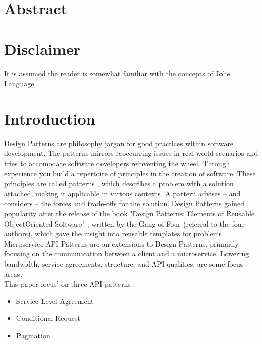 \documentclass[12pt]{article}
\begin{document}

\tableofcontents
\newpage


\section{Abstract}

\section{Disclaimer}
It is assumed the reader is somewhat familiar with the concepts of Jolie Language. 

\newpage

\section{Introduction}
Design Patterns are philosophy jargon for good practices within software development. The patterns mirrors reoccurring issues in real-world scenarios and tries to accomodate software developers reinventing the wheel. Through experience you build a repertoire of principles in the creation of software. These principles are called patterns \cite{Applying_Patterns:1}, which describes a problem with a solution attached, making it applicable in various contexts. A pattern advises -- and considers -- the forces and trade-offs for the solution. Design Patterns gained popularity after the release of the book "Design Patterns: Elements of Reusable Object\-Oriented Software" \cite{DesignPGoF:1}, written by the Gang-of-Four (referral to the four authors), which gave the insight into reusable templates for problems. Microservice API Patterns are an extensions to Design Patterns, primarily focusing on the communication between a client and a microservice. Lowering bandwidth, service agreements, structure, and API qualities, are some focus areas. \\
This paper focus' on three API patterns \cite{MAPIPweb:1}: 

\begin{itemize}
    \item Service Level Agreement
    \item Conditional Request
    \item Pagination
\end{itemize}
\end{document}
